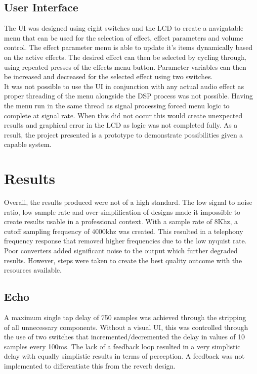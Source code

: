 \documentclass[titlepage]{scrartcl}
\begin{document}
    \subsection{User Interface}
    The UI was designed using eight switches and the LCD to create a
    navigatable menu that can be used for the selection of effect, effect
    parameters and volume control. The effect parameter menu is able to update
    it's items dynamically based on the active effects. The desired effect can
    then be selected by cycling through, using repeated presses of the effects
    menu button. Parameter variables can then be increased and decreased for
    the selected effect using two switches.\\
    It was not possible to use the UI in conjunction with any actual audio
    effect as proper threading of the menu alongside the DSP process was not
    possible. Having the menu run in the same thread as signal processing
    forced menu logic to complete at signal rate. When this did not occur this
    would create unexpected results and graphical error in the LCD as logic was
    not completed fully. As a result, the project presented is a prototype to
    demonstrate possibilities given a capable system.

    \section{Results}
    Overall, the results produced were not of a high standard. The low signal
    to noise ratio, low sample rate and over-simplification of designs made it
    impossible to create results usable in a professional context. With a
    sample rate of 8Khz, a cutoff sampling frequency of 4000khz was created.
    This resulted in a telephony frequency response that removed higher
    frequencies due to the low nyquist rate. Poor converters added significant
    noise to the output which further degraded results. However, steps were
    taken to create the best quality outcome with the resources available.

        \subsection{Echo}
        A maximum single tap delay of 750 samples was achieved through the
        stripping of all unnecessary components. Without a visual UI,
        this was controlled through the use of two switches that
        incremented/decremented the delay in values of 10 samples every 100ms. 
        The lack of a feedback loop resulted in a very simplistic delay with
        equally simplistic results in terms of perception. A feedback was not
        implemented to differentiate this from the reverb design.
\end{document}
